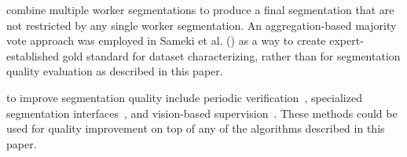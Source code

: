  combine multiple worker segmentations to produce a final segmentation that are not restricted by any single worker segmentation. An aggregation-based majority vote approach was employed in Sameki et al. (\citeyear{Sameki2015}) as a way to create expert-established gold standard for dataset characterizing, rather than for segmentation quality evaluation as described in this paper.

 to improve segmentation quality include periodic verification~\cite{Lin2014,Everingham15}, specialized segmentation interfaces~\cite{Song2018}, and vision-based supervision~\cite{Russakovsky2015,Gurari2016}. These methods could be used for quality improvement on top of any of the algorithms described in this paper.  %

